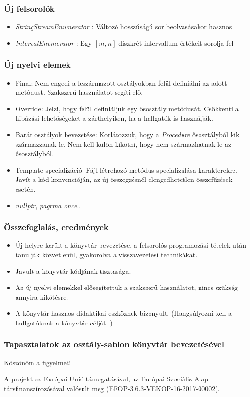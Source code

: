 \documentclass[11pt]{beamer}
\begin{document}
\begin{frame}
	\frametitle{Új felsorolók}
	\begin{itemize}
		\item \textit{StringStreamEnumerator} : Változó hosszúságú sor beolvasásakor hasznos
		
		\item \textit{IntervalEnumerator} : Egy $[m,n]$ diszkrét intervallum értékeit sorolja fel
		
	\end{itemize}
\end{frame}

\begin{frame}
	\frametitle{Új nyelvi elemek}
	\begin{itemize}
		\item Final: Nem engedi a leszármazott osztályokban felül definiálni az adott metódust. Szakszerű használatot segíti elő.
		\item Override: Jelzi, hogy felül definiáljuk egy ősosztály metódusát. Csökkenti a hibázási lehetőségeket a zárthelyiken, ha a hallgatók is használják.
		\item Barát osztályok bevezetése: Korlátozzuk, hogy a \textit{Procedure} ősosztályból kik származzanak le. Nem kell külön kikötni, hogy nem származhatnak le az ősosztályból.
		\item Template specializáció: Fájl létrehozó metódus specializálása karakterekre. Javít a kód konvencióján, az új összegzésnél elengedhetetlen összefűzések esetén.
		\item \textit{nullptr}, \textit{pagrma once}..
	\end{itemize}
\end{frame}

\begin{frame}
	\frametitle{Összefoglalás, eredmények}
	\begin{itemize}
		\item Új helyre került a könyvtár bevezetése, a felsorolós programozási tételek után tanulják közvetlenül, gyakorolva a visszavezetési technikákat.
		\item Javult a könyvtár kódjának tisztasága.
		\item Az új nyelvi elemekkel elősegítettük a szakszerű használatot, nincs szükség annyira kikötésre.
		\item A könyvtár hasznos didaktikai eszköznek bizonyult. (Hangsúlyozni kell a hallgatóknak a könyvtár célját..)
	\end{itemize}
\end{frame}

\begin{frame}
	\frametitle{Tapasztalatok az osztály-sablon könyvtár bevezetésével}
	\begin{center}
		\Large{Köszönöm a figyelmet!}
	
	\vspace*{25px}
	{\small A projekt az Európai Unió támogatásával, az Európai Szociális Alap társfinanszírozásával valósult meg (EFOP-3.6.3-VEKOP-16-2017-00002).}\end{center}
\end{frame}
\end{document}

